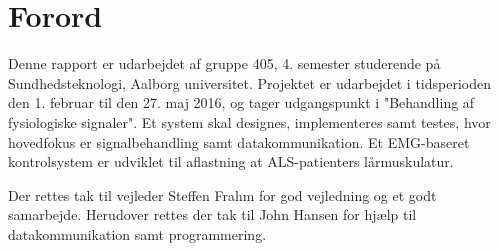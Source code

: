 \section{Forord}
Denne rapport er udarbejdet af gruppe 405, 4. semester studerende på Sundhedsteknologi, Aalborg universitet. Projektet er udarbejdet i tidsperioden den 1. februar til den 27. maj 2016, og tager udgangspunkt i "Behandling af fysiologiske signaler".  Et system skal designes, implementeres samt testes, hvor hovedfokus er signalbehandling samt datakommunikation. Et EMG-baseret kontrolsystem er udviklet til aflastning at ALS-patienters lårmuskulatur. 

Der rettes tak til vejleder Steffen Frahm for god vejledning og et godt samarbejde. Herudover rettes der tak til John Hansen for hjælp til datakommunikation samt programmering. 